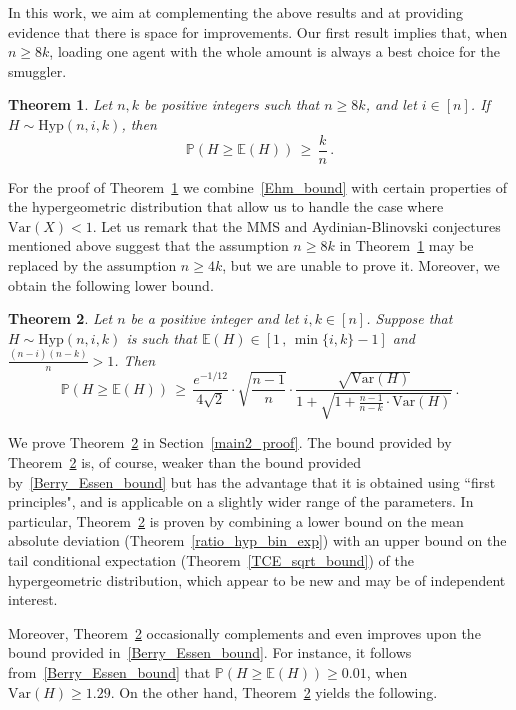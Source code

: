 \documentclass[10pt]{article}
\theoremstyle{plain}
\newtheorem{theorem}{Theorem}[section]
\theoremstyle{definition}
\theoremstyle{remark}
\newcommand{\Prb}{\mathbb{P}}
\newcommand{\Exp}{\mathbb{E}}
\begin{document}
In this work, we aim at complementing the above results and at providing evidence that there is space for improvements.  
Our first result implies that, when $n\ge 8k$, loading one agent with the whole amount is always a best choice for the smuggler. 


\begin{theorem}\label{main}
Let $n,k$ be positive integers such that $n\ge 8k$, and let $i\in [n]$. If 
$H\sim\text{Hyp}(n,i,k)$,  then 
\[
\Prb\left(H \ge \Exp(H)\right) \,\ge\, \frac{k}{n} \, .
\]
\end{theorem}

For the proof of Theorem~\ref{main} we combine~\eqref{Ehm_bound} with certain properties of the hypergeometric distribution that allow us to handle the case where $\text{Var}(X)<1$.  
Let us remark that the MMS and Aydinian-Blinovski conjectures mentioned above suggest that the assumption $n\ge 8k$ in Theorem~\ref{main} may be replaced by the assumption $n\ge 4k$, but we are unable to prove it. 
Moreover, we obtain the following lower bound. 

\begin{theorem}\label{main2}
Let $n$ be a positive integer and let $i,k\in [n]$. Suppose that  $H\sim\text{Hyp}(n,i,k)$ is such that $\Exp(H)\in [1\,,\,\min\{i,k\}-1]$ and\,  $\frac{(n-i)(n-k)}{n}> 1$. Then \, 
\[
\Prb(H\ge \Exp(H)) \,\ge\,\frac{e^{-1/12}}{4\sqrt{2}} \cdot \sqrt{\frac{n-1}{n}} \cdot\frac{ \sqrt{\text{Var}(H)} }{1 + \sqrt{1+ \frac{n-1}{n-k}\cdot\text{Var}(H)}} \, . 
\]
\end{theorem}



We prove Theorem~\ref{main2} in Section~\ref{main2_proof}.  
The bound provided by Theorem~\ref{main2} is, of course, weaker than the bound provided by~\eqref{Berry_Essen_bound} but has the advantage that it is obtained using ``first principles", and is applicable on a slightly  wider range of the parameters. 
In particular, Theorem~\ref{main2} is proven by combining a lower bound on the mean absolute deviation (Theorem~\ref{ratio_hyp_bin_exp}) with an upper bound on the tail conditional expectation (Theorem~\ref{TCE_sqrt_bound}) of the hypergeometric distribution, which appear to be new and  may be of independent interest. 

Moreover, Theorem~\ref{main2} occasionally  complements and even improves upon the bound provided in~\eqref{Berry_Essen_bound}. For instance, it follows from~\eqref{Berry_Essen_bound} that  $\Prb(H\ge \Exp(H))\ge 0.01$, when $\text{Var}(H) \ge 1.29$. 
On the other hand, Theorem~\ref{main2} yields the following.  
\end{document}
